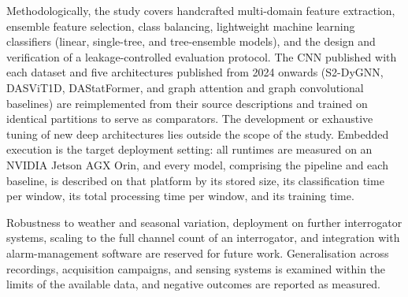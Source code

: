Methodologically, the study covers handcrafted multi-domain feature extraction, ensemble feature selection, class balancing, lightweight machine learning classifiers (linear, single-tree, and tree-ensemble models), and the design and verification of a leakage-controlled evaluation protocol. The CNN published with each dataset and five architectures published from 2024 onwards (S2-DyGNN, DASViT1D, DAStatFormer, and graph attention and graph convolutional baselines) are reimplemented from their source descriptions and trained on identical partitions to serve as comparators. The development or exhaustive tuning of new deep architectures lies outside the scope of the study. Embedded execution is the target deployment setting: all runtimes are measured on an NVIDIA Jetson AGX Orin, and every model, comprising the pipeline and each baseline, is described on that platform by its stored size, its classification time per window, its total processing time per window, and its training time.

Robustness to weather and seasonal variation, deployment on further interrogator systems, scaling to the full channel count of an interrogator, and integration with alarm-management software are reserved for future work. Generalisation across recordings, acquisition campaigns, and sensing systems is examined within the limits of the available data, and negative outcomes are reported as measured.

